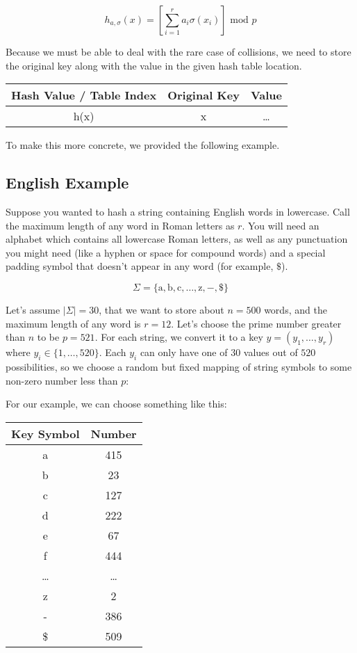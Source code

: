 \documentclass{article}[10pth]
\begin{document}
\begin{equation}
h_{a,\sigma}(x) = \left[ \sum_{i=1}^r a_i\sigma(x_i)\right] \textrm{ mod } p
\end{equation}

Because we must be able to deal with the rare case of collisions, we need
to store the original key along with the value in the given hash table
location.

\begin{center}
\begin{tabular}{|c|c|c|}
\hline
\textbf{Hash Value / Table Index} & \textbf{Original Key} & \textbf{Value}\\
\hline
h(x) & x & \ldots\\
\hline
\end{tabular}
\end{center}

To make this more concrete, we provided the following example.

\subsection{English Example}

Suppose you wanted to hash a string containing English
words in lowercase.
Call the maximum length of any word in Roman letters as $r$.
You will need an alphabet which contains all lowercase Roman letters,
as well as any punctuation you might need (like a hyphen or space for compound
words) and a special padding symbol that doesn't appear in any word
(for example, $\$$).

\begin{equation}
\Sigma = \{\textrm{a},\textrm{b},\textrm{c},\ldots,\textrm{z},-,\$\}
\end{equation}

Let's assume $|\Sigma| = 30$, that we want to store about $n=500$
words, and the maximum length of any word is $r=12$.
Let's choose the prime number greater than $n$ to be
$p = 521$. For each string, we convert it to a
key $y = (y_1,\ldots,y_r)$ where $y_i \in \{1, \ldots, 520\}$. Each $y_i$
can only have one of $30$ values out of $520$ possibilities, so we choose
a random but fixed mapping of string symbols to some non-zero
number less than $p$:

For our example, we can choose something like this:

\begin{center}
\begin{tabular}{|c|c|}
\hline
\textbf{Key Symbol} & \textbf{Number}\\
\hline
a & 415\\
\hline
b & 23\\
\hline
c & 127\\
\hline
d & 222\\
\hline
e & 67\\
\hline
f & 444\\
\hline
\ldots & \ldots\\
\hline
z & 2\\
\hline
- & 386\\
\hline
\$ & 509\\
\hline
\end{tabular}
\end{center}
\end{document}

